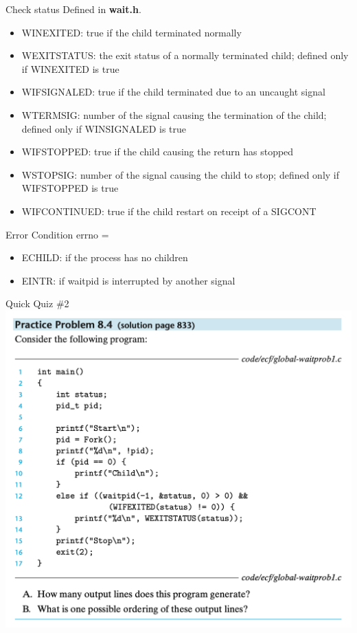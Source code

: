 \documentclass{beamer}
\begin{document}
    \begin{frame}{Check status}
        Defined in \textbf{wait.h}.\\
    \begin{itemize}
        \item WINEXITED: true if the child terminated normally
        \item WEXITSTATUS: the exit status of a normally terminated child; defined only if WINEXITED is true
        \item WIFSIGNALED: true if the child terminated due to an uncaught signal
        \item WTERMSIG: number of the signal causing the termination of the child; defined only if WINSIGNALED is true
        \item WIFSTOPPED: true if the child causing the return has stopped
        \item WSTOPSIG: number of the signal causing the child to stop; defined only if WIFSTOPPED is true
        \item WIFCONTINUED: true if the child restart on receipt of a SIGCONT
    \end{itemize}
    \end{frame}
    \begin{frame}{Error Condition}
        errno = 
        \begin{itemize}
            \item ECHILD: if the process has no children
            \item EINTR: if waitpid is interrupted by another signal
        \end{itemize}
    \end{frame}
    \begin{frame}{Quick Quiz \#2}
        \includegraphics[width=\textwidth]{quiz1.png}
    \end{frame}
\end{document}

